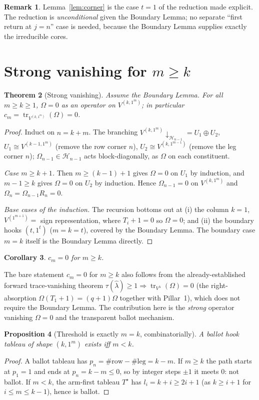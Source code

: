 \documentclass[11pt]{article}
\newtheorem{theorem}{Theorem}
\newtheorem{proposition}[theorem]{Proposition}
\newtheorem{corollary}[theorem]{Corollary}
\theoremstyle{definition}
\newtheorem{remark}[theorem]{Remark}
\newcommand{\Om}{\Omega}
\newcommand{\HH}{\mathcal{H}}
\newcommand{\la}{\lambda}
\DeclareMathOperator{\tr}{tr}
\begin{document}
\begin{remark}
Lemma~\ref{lem:corner} is the case $t=1$ of the reduction made explicit. The reduction is
\emph{unconditional} given the Boundary Lemma; no separate ``first return at $j=n$'' case is
needed, because the Boundary Lemma supplies exactly the irreducible cores.
\end{remark}

\section{Strong vanishing for $m\ge k$}

\begin{theorem}[Strong vanishing]\label{thm:strong}
Assume the Boundary Lemma. For all $m\ge k\ge 1$, $\Om=0$ as an operator on $V^{(k,1^m)}$;
in particular $c_m=\tr_{V^{(k,1^m)}}(\Om)=0$.
\end{theorem}
\begin{proof}
Induct on $n=k+m$. The branching $V^{(k,1^m)}\!\downarrow_{\HH_{n-1}}
=U_1\oplus U_2$, $U_1\cong V^{(k-1,1^m)}$ (remove the row corner $n$),
$U_2\cong V^{(k,1^{m-1})}$ (remove the leg corner $n$); $\Om_{n-1}\in\HH_{n-1}$ acts
block-diagonally, as $\Om$ on each constituent.

\emph{Case $m\ge k+1$.} Then $m\ge (k-1)+1$ gives $\Om=0$ on $U_1$ by induction, and
$m-1\ge k$ gives $\Om=0$ on $U_2$ by induction. Hence $\Om_{n-1}=0$ on $V^{(k,1^m)}$ and
$\Om_n=\Om_{n-1}R_n=0$.

\emph{Base cases of the induction.} The recursion bottoms out at (i) the column $k=1$,
$V^{(1^{m+1})}=$ sign representation, where $T_i+1=0$ so $\Om=0$; and (ii) the boundary hooks
$(t,1^t)$ ($m=k=t$), covered by the Boundary Lemma. The boundary case $m=k$ itself is the
Boundary Lemma directly.
\end{proof}

\begin{corollary}
$c_m=0$ for $m\ge k$.
\end{corollary}

\noindent
The bare statement $c_m=0$ for $m\ge k$ also follows from the already-established forward
trace-vanishing theorem $\tau(\hat\la)\ge1\Rightarrow\tr_{V^\la}(\Om)=0$ (the right-absorption
$\Om(T_1+1)=(q+1)\Om$ together with Pillar~1), which does not require the Boundary Lemma. The
contribution here is the \emph{strong} operator vanishing $\Om=0$ and the transparent ballot
mechanism.

\begin{proposition}[Threshold is exactly $m=k$, combinatorially]\label{prop:threshold}
A ballot hook tableau of shape $(k,1^m)$ exists iff $m<k$.
\end{proposition}
\begin{proof}
A ballot tableau has $p_n=\#\text{row}-\#\text{leg}=k-m$. If $m\ge k$ the path starts at
$p_1=1$ and ends at $p_n=k-m\le 0$, so by integer steps $\pm1$ it meets $0$: not ballot.
If $m<k$, the arm-first tableau $T^\star$ has $l_i=k+i\ge 2i+1$ (as $k\ge i+1$ for $i\le m\le
k-1$), hence is ballot.
\end{proof}
\end{document}
